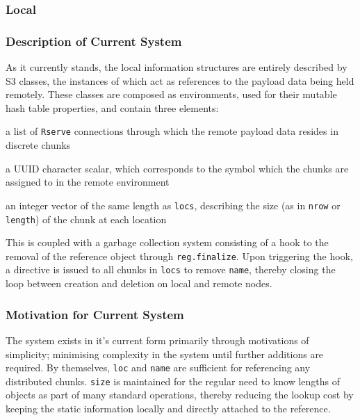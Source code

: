 \hypertarget{local}{%
\subsubsection{Local}\label{local}}

\hypertarget{description-of-current-system}{%
\subsubsection{Description of Current
System}\label{description-of-current-system}}

As it currently stands, the local information structures are entirely
described by S3 classes, the instances of which act as references to the
payload data being held remotely. These classes are composed as
environments, used for their mutable hash table properties, and contain
three elements:

\begin{description}
\tightlist
\item[\texttt{locs}]
a list of \texttt{Rserve} connections through which the remote payload
data resides in discrete chunks
\item[\texttt{name}]
a UUID character scalar, which corresponds to the symbol which the
chunks are assigned to in the remote environment
\item[\texttt{size}]
an integer vector of the same length as \texttt{locs}, describing the
size (as in \texttt{nrow} or \texttt{length}) of the chunk at each
location
\end{description}

This is coupled with a garbage collection system consisting of a hook to
the removal of the reference object through \texttt{reg.finalize}. Upon
triggering the hook, a directive is issued to all chunks in
\texttt{locs} to remove \texttt{name}, thereby closing the loop between
creation and deletion on local and remote nodes.

\hypertarget{motivation-for-current-system}{%
\subsubsection{Motivation for Current
System}\label{motivation-for-current-system}}

The system exists in it's current form primarily through motivations of
simplicity; minimising complexity in the system until further additions
are required. By themselves, \texttt{loc} and \texttt{name} are
sufficient for referencing any distributed chunks. \texttt{size} is
maintained for the regular need to know lengths of objects as part of
many standard operations, thereby reducing the lookup cost by keeping
the static information locally and directly attached to the reference.

